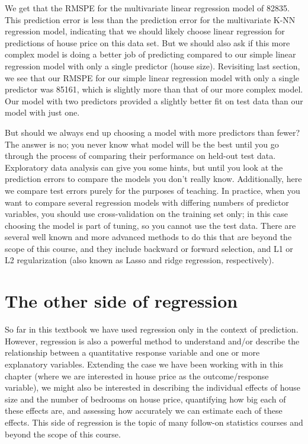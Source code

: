 \documentclass[
]{krantz}
\begin{document}
We get that the RMSPE for the multivariate linear regression model
of 82835. This prediction error
is less than the prediction error for the multivariate K-NN regression model,
indicating that we should likely choose linear regression for predictions of
house price on this data set. But we should also ask if this more complex
model is doing a better job of predicting compared to our simple linear
regression model with only a single predictor (house size). Revisiting last
section, we see that our RMSPE for our simple linear regression model with
only a single predictor was
85161,
which is slightly more than that of our more complex model. Our model with two predictors
provided a slightly better fit on test data than our model with just one.

But should we always end up choosing a model with more predictors than fewer?
The answer is no; you never know what model will be the best until you go through the
process of comparing their performance on held-out test data. Exploratory
data analysis can give you some hints, but until you look
at the prediction errors to compare the models you don't really know.
Additionally, here we compare test errors purely for the purposes of teaching.
In practice, when you want to compare several regression models with
differing numbers of predictor variables, you should use
cross-validation on the training set only; in this case choosing the model is part
of tuning, so you cannot use the test data. There are several well known and more advanced
methods to do this that are beyond the scope of this course, and they include
backward or forward selection, and L1 or L2 regularization (also known as Lasso
and ridge regression, respectively).

\hypertarget{the-other-side-of-regression}{%
\section{The other side of regression}\label{the-other-side-of-regression}}

So far in this textbook we have used regression only in the context of
prediction. However, regression is also a powerful method to understand and/or
describe the relationship between a quantitative response variable and
one or more explanatory variables. Extending the case we have been working with
in this chapter (where we are interested in house price as the outcome/response
variable), we might also be interested in describing the
individual effects of house size and the number of bedrooms on house price,
quantifying how big each of these effects are, and assessing how accurately we
can estimate each of these effects. This side of regression is the topic of
many follow-on statistics courses and beyond the scope of this course.
\end{document}
